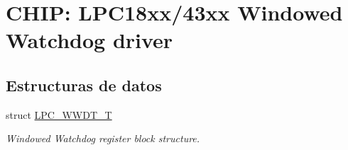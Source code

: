 \hypertarget{group___w_w_d_t__18_x_x__43_x_x}{}\section{C\+H\+IP\+: L\+P\+C18xx/43xx Windowed Watchdog driver}
\label{group___w_w_d_t__18_x_x__43_x_x}
\subsection*{Estructuras de datos}
\begin{DoxyCompactItemize}
\item 
struct \hyperlink{struct_l_p_c___w_w_d_t___t}{L\+P\+C\+\_\+\+W\+W\+D\+T\+\_\+T}
\begin{DoxyCompactList}\small\item\em Windowed Watchdog register block structure. \end{DoxyCompactList}\end{DoxyCompactItemize}
